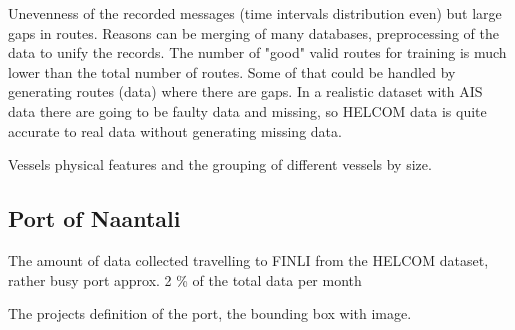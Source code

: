\documentclass[../main.tex]{subfiles}
\begin{document}
Unevenness of the recorded messages (time intervals distribution even) but large gaps in routes. Reasons can be merging of many databases, preprocessing of the data to unify the records. The number of "good" valid routes for training is much lower than the total number of routes. Some of that could be handled by generating routes (data) where there are gaps. In a realistic dataset with AIS data there are going to be faulty data and missing, so HELCOM data is quite accurate to real data without generating missing data.

Vessels physical features and the grouping of different vessels by size.

\subsection{Port of Naantali}

The amount of data collected travelling to FINLI from the HELCOM dataset, rather busy port approx. 2 \% of the total data per month

The projects definition of the port, the bounding box with image.
\end{document}
